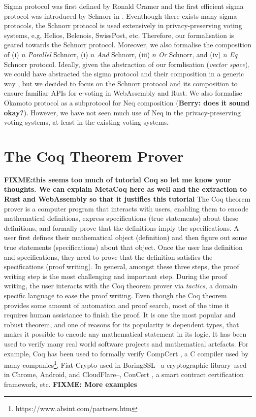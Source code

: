\documentclass[conference,compsoc]{IEEEtran}
\begin{document}
Sigma protocol was first defined by Ronald Cramer \cite{cramer1996modular} 
and the first efficient sigma protocol was introduced by Schnorr in \cite{schnorr1991efficient}. 
Eventhough there exists many sigma protocols, the Schnorr protocol is used extensively in privacy-preserving voting systems, e.g, Helios, Belenois, SwissPost, etc. Therefore, 
our formalisation is geared towards the Schnorr protocol. 
Moreover, we also formalise the composition of (i) $n$ \textit{Parallel} Schnorr, 
(i) $n$ \textit{And} Schnorr, (iii) $n$ \textit{Or} Schnorr, and (iv) $n$ \textit{Eq} Schnorr protocol. 
Ideally, given the abstraction of our formlisation (\textit{vector space}), we could have 
abstracted the sigma protocol and their composition in a generic way \cite{10.1007/978-3-642-02384-2_17},
but we decided to focus on the Schnorr protocol and its composition to ensure familiar APIs 
for e-voting in WebAssembly and Rust. We also formalise Okamoto protocol as a subprotocol 
for Neq composition (\textbf{Berry: does it sound okay?}). However, we have not seen 
much use of Neq in the privacy-preserving voting systems, at least in the existing voting systems. 




\section{The Coq Theorem Prover}
\textbf{FIXME:this seems too much of tutorial Coq so let me know your thoughts. We 
can explain MetaCoq here as well and the extraction to Rust and WebAssembly
so that it justifies this tutorial}
The Coq theorem prover \cite{the_coq_development_team} is a computer program that interacts with users, 
enabling them to encode mathematical definitions, express specifications (true statements) about 
these definitions, and formally prove that the definitions imply the specifications. 
A user first defines their mathematical object (definition) and then figure 
out some  true statements (specifications) about 
that object. Once the user has definition 
and specifications, they need to prove 
that the definition satisfies the specifications 
(proof writing). In general, amongst these three steps, 
the proof writing step is the most challenging and important step. 
During the proof writing, the user interacts with the Coq theorem prover 
via \emph{tactics}, a domain specific language 
to ease the proof writing. Even though the Coq theorem 
provides some amount of automation and proof 
search, most of the time it requires human assistance to finish the proof. 
It is one the most popular and robust theorem, and
one of reasons for its popularity is 
dependent types, that makes it possible to encode
any mathematical statement in its logic.
It has been used to verify many real world software projects and mathematical 
artefacts. For example, Coq has been used to 
formally verify CompCert \cite{10.1145/1111037.1111042}, 
a C compiler used by many companies\footnote{https://www.absint.com/partners.htm}, 
Fiat-Crypto \cite{8835346} 
used in BoringSSL --a cryptographic library used in Chrome, Android, 
and CloudFlare--, ConCert \cite{10.1145/3372885.3373829}, 
a smart contract certification framework, etc. \textbf{FIXME: More examples}
\end{document}
